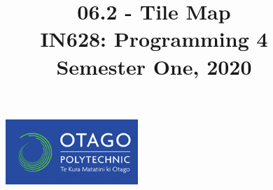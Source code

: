 \documentclass{article}
\author{}
\begin{document}
\begin{figure}
  \includegraphics[width=50mm]{../../resources/img/logo.png}
\end{figure}

\title{06.2 - Tile Map\\IN628: Programming 4\\Semester One, 2020}
\date{}
\maketitle
\end{document}

